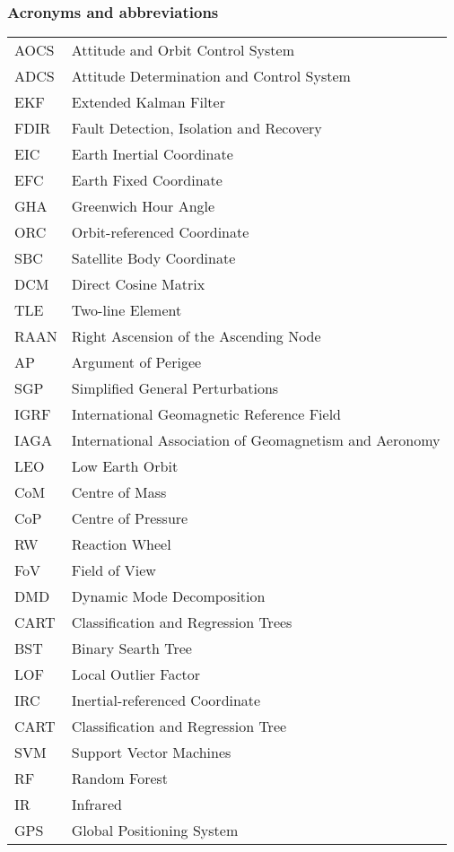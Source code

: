 \newpage
\subsubsection*{Acronyms and abbreviations}

\begingroup
\renewcommand{\arraystretch}{1.2}
\begin{tabular}{@{}p{2.5cm} l}
    AOCS	& Attitude and Orbit Control System \\
    ADCS	& Attitude Determination and Control System \\
    EKF		& Extended Kalman Filter \\
    FDIR	& Fault Detection, Isolation and Recovery \\
    EIC		& Earth Inertial Coordinate \\
    EFC		& Earth Fixed Coordinate \\
    GHA 	& Greenwich Hour Angle \\
    ORC 	& Orbit-referenced Coordinate \\
    SBC 	& Satellite Body Coordinate \\
    DCM 	& Direct Cosine Matrix \\
    TLE 	& Two-line Element \\
    RAAN	& Right Ascension of the Ascending Node \\
    AP		& Argument of Perigee \\
    SGP 	& Simplified General Perturbations \\
    IGRF	& International Geomagnetic Reference Field \\
    IAGA	& International Association of Geomagnetism and Aeronomy \\
    LEO		& Low Earth Orbit \\
    CoM		& Centre of Mass \\
    CoP 	& Centre of Pressure \\
    RW		& Reaction Wheel \\
    FoV		& Field of View \\
    DMD 	& Dynamic Mode Decomposition \\    
    CART	& Classification and Regression Trees \\
    BST		& Binary Searth Tree \\
    LOF		& Local Outlier Factor \\
    IRC		& Inertial-referenced Coordinate \\
    CART	& Classification and Regression Tree \\
    SVM		& Support Vector Machines \\
    RF		& Random Forest \\
    IR		& Infrared \\
    GPS		& Global Positioning System \\
    
\end{tabular}
\endgroup
